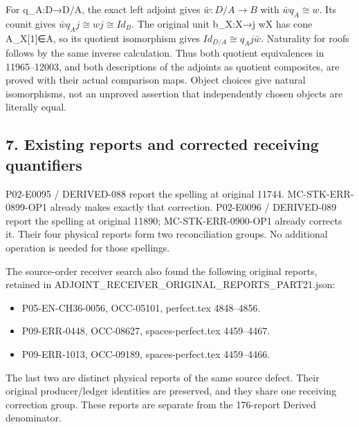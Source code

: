 For q\_\allowbreak{}A:\allowbreak{}D\allowbreak{}→D/\allowbreak{}A,\allowbreak{} the exact left adjoint gives \(\bar w:D/A\to B\) with \(\bar w q_A\cong w\). Its counit gives \(\bar w q_A j\cong wj\cong Id_B\). The original unit b\_\allowbreak{}X:\allowbreak{}X\allowbreak{}→j wX has cone A\_\allowbreak{}X[1]\allowbreak{}\allowbreak{}∈A,\allowbreak{} so its quotient isomorphism gives \(Id_{D/A}\cong q_A j\bar w\). Naturality for roofs follows by the same inverse calculation. Thus both quotient equivalences in 11965–\allowbreak{}12003,\allowbreak{} and both descriptions of the adjoints as quotient composites,\allowbreak{} are proved with their actual comparison maps. Object choices give natural isomorphisms,\allowbreak{} not an unproved assertion that independently chosen objects are literally equal.

\subsection{7. Existing reports and corrected receiving quantifiers}\label{proofs-11665-12003-existing-reports-and-corrected-receiving-quantifiers}

P02-E0095 /\allowbreak{} DERIVED-088 report the spelling at original 11744. MC-STK-ERR-0899-OP1 already makes exactly that correction. P02-E0096 /\allowbreak{} DERIVED-089 report the spelling at original 11890; MC-STK-ERR-0900-OP1 already corrects it. Their four physical reports form two reconciliation groups. No additional operation is needed for those spellings.

The source-order receiver search also found the following original reports,\allowbreak{} retained in ADJOINT\_\allowbreak{}RECEIVER\_\allowbreak{}ORIGINAL\_\allowbreak{}REPORTS\_\allowbreak{}PART21.json:\allowbreak{}

\begin{itemize}
\tightlist
\item
  P05-EN-CH36-0056,\allowbreak{} OCC-05101,\allowbreak{} perfect.tex 4848–\allowbreak{}4856.
\item
  P09-ERR-0448,\allowbreak{} OCC-08627,\allowbreak{} spaces-perfect.tex 4459–\allowbreak{}4467.
\item
  P09-ERR-1013,\allowbreak{} OCC-09189,\allowbreak{} spaces-perfect.tex 4459–\allowbreak{}4466.
\end{itemize}

The last two are distinct physical reports of the same source defect. Their original producer/\allowbreak{}ledger identities are preserved,\allowbreak{} and they share one receiving correction group. These reports are separate from the 176-report Derived denominator.

